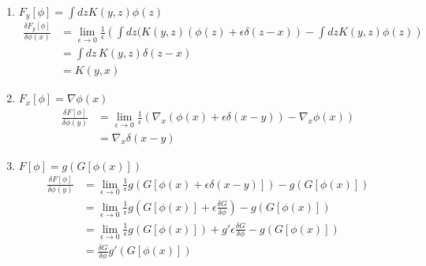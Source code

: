 \documentclass[10pt,a4paper]{book}
\theoremstyle{definition}
\begin{document}
\begin{enumerate}
    
    \item $F_y[\phi]=\int dz K(y,z)\phi(z)$
    \begin{align}
        \frac{\delta F_y[\phi]}{\delta\phi(x)}
           &=\lim_{\epsilon\rightarrow0}\frac{1}{\epsilon}\left(\int dz(K(y,z)(\phi(z)+\epsilon\delta(z-x)) -\int dz K(y,z)\phi(z)\right)\\
           &=\int dz\,K(y,z)\delta(z-x)\\
           &=K(y,x)
    \end{align}
    \item $F_x[\phi]=\nabla\phi(x)$
    \begin{align}
        \frac{\delta F[\phi]}{\delta\phi(y)}
        &=\lim_{\epsilon\rightarrow0}\frac{1}{\epsilon}\left( \nabla_x(\phi(x)+\epsilon\delta(x-y)) - \nabla_x\phi(x)\right)\\
        &=\nabla_x\delta(x-y)
    \end{align}
    \item $F[\phi]=g\left(G[\phi(x)]\right)$
    \begin{align}
        \frac{\delta F[\phi]}{\delta\phi(y)}
        &=\lim_{\epsilon\rightarrow0}\frac{1}{\epsilon}g(G[\phi(x)+\epsilon\delta(x-y)])-g(G[\phi(x)])\\
        &=\lim_{\epsilon\rightarrow0}\frac{1}{\epsilon}g(G[\phi(x)]+\epsilon\frac{\delta G}{\delta \phi})-g(G[\phi(x)])\\
        &=\lim_{\epsilon\rightarrow0}\frac{1}{\epsilon}g(G[\phi(x)])+g' \epsilon\frac{\delta G}{\delta \phi}-g(G[\phi(x)])\\
        &=\frac{\delta G}{\delta \phi}g'(G[\phi(x)])
    \end{align}
    
\end{enumerate}
\end{document}
